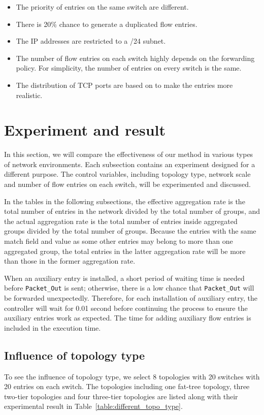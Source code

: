 \documentclass[conference]{IEEEtran}
\begin{document}
\begin{itemize}
\item
The priority of entries on the same switch are different.
\item
There is 20\% chance to generate a duplicated flow entries. 
\item
The IP addresses are restricted to a /24 subnet.
\item
The number of flow entries on each switch highly depends on the forwarding policy. For simplicity, the number of entries on every switch is the same. 
\item
The distribution of TCP ports are based on \cite{PORT_FREQ} to make the entries more realistic.
\end{itemize}

\section{Experiment and result}
In this section, we will compare the effectiveness of our method in various types of network environments. Each subsection contains an experiment designed for a different purpose. The control variables, including topology type, network scale and number of flow entries on each switch, will be experimented and discussed. 

In the tables in the following subsections, the effective aggregation rate is the total number of entries in the network divided by the total number of groups, and the actual aggregation rate is the total number of entries inside aggregated groups divided by the total number of groups. Because the entries with the same match field and value as some other entries may belong to more than one aggregated group, the total entries in the latter aggregation rate will be more than those in the former aggregation rate. 

When an auxiliary entry is installed, a short period of waiting time is needed before \texttt{Packet\_Out} is sent; otherwise, there is a low chance that \texttt{Packet\_Out} will be forwarded unexpectedly. Therefore, for each installation of auxiliary entry, the controller will wait for 0.01 second before continuing the process to ensure the auxiliary entries work as expected. The time for adding auxiliary flow entries is included in the execution time.

\subsection{Influence of topology type}
To see the influence of topology type, we select 8 topologies with 20 switches with 20 entries on each switch. The topologies including one fat-tree topology, three two-tier topologies and four three-tier topologies are listed along with their experimental result in Table~\ref{table:different_topo_type}. 
\end{document}
